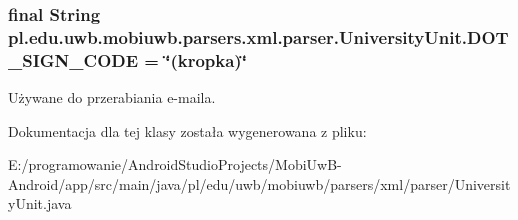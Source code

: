 \subsubsection[{D\+O\+T\+\_\+\+S\+I\+G\+N\+\_\+\+C\+O\+D\+E}]{\setlength{\rightskip}{0pt plus 5cm}final String pl.\+edu.\+uwb.\+mobiuwb.\+parsers.\+xml.\+parser.\+University\+Unit.\+D\+O\+T\+\_\+\+S\+I\+G\+N\+\_\+\+C\+O\+D\+E = \char`\"{}(kropka)\char`\"{}\hspace{0.3cm}{\ttfamily [static]}}\label{classpl_1_1edu_1_1uwb_1_1mobiuwb_1_1parsers_1_1xml_1_1parser_1_1_university_unit_a30bee36a042028b337f13b3d0e6ac35e}
Używane do przerabiania e-\/maila. 

Dokumentacja dla tej klasy została wygenerowana z pliku\+:\begin{DoxyCompactItemize}
\item 
E\+:/programowanie/\+Android\+Studio\+Projects/\+Mobi\+Uw\+B-\/\+Android/app/src/main/java/pl/edu/uwb/mobiuwb/parsers/xml/parser/University\+Unit.\+java\end{DoxyCompactItemize}
